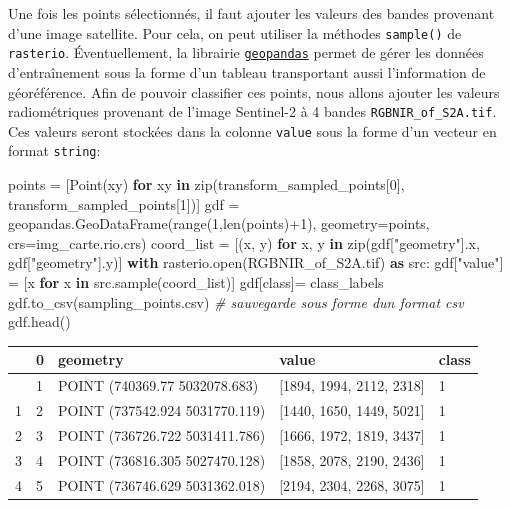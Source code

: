 \documentclass[
]{article}
\newenvironment{Shaded}{}{}
\newcommand{\BuiltInTok}[1]{\textcolor[rgb]{0.00,0.50,0.00}{#1}}
\newcommand{\CommentTok}[1]{\textcolor[rgb]{0.38,0.63,0.69}{\textit{#1}}}
\newcommand{\ControlFlowTok}[1]{\textcolor[rgb]{0.00,0.44,0.13}{\textbf{#1}}}
\newcommand{\DecValTok}[1]{\textcolor[rgb]{0.25,0.63,0.44}{#1}}
\newcommand{\ImportTok}[1]{\textcolor[rgb]{0.00,0.50,0.00}{\textbf{#1}}}
\newcommand{\KeywordTok}[1]{\textcolor[rgb]{0.00,0.44,0.13}{\textbf{#1}}}
\newcommand{\NormalTok}[1]{#1}
\newcommand{\OperatorTok}[1]{\textcolor[rgb]{0.40,0.40,0.40}{#1}}
\newcommand{\StringTok}[1]{\textcolor[rgb]{0.25,0.44,0.63}{#1}}
\begin{document}
Une fois les points sélectionnés, il faut ajouter les valeurs des bandes
provenant d'une image satellite. Pour cela, on peut utiliser la méthodes
\texttt{sample()} de \texttt{rasterio}. Éventuellement, la librairie
\href{https://geopandas.org}{\texttt{geopandas}} permet de gérer les
données d'entraînement sous la forme d'un tableau transportant aussi
l'information de géoréférence. Afin de pouvoir classifier ces points,
nous allons ajouter les valeurs radiométriques provenant de l'image
Sentinel-2 à 4 bandes \texttt{RGBNIR\_of\_S2A.tif}. Ces valeurs seront
stockées dans la colonne \texttt{value} sous la forme d'un vecteur en
format \texttt{string}:

\label{4b62cf70}
\label{cb12}
\begin{Shaded}
\begin{Highlighting}[]
\NormalTok{points }\OperatorTok{=}\NormalTok{ [Point(xy) }\ControlFlowTok{for}\NormalTok{ xy }\KeywordTok{in} \BuiltInTok{zip}\NormalTok{(transform\_sampled\_points[}\DecValTok{0}\NormalTok{], transform\_sampled\_points[}\DecValTok{1}\NormalTok{])]}
\NormalTok{gdf }\OperatorTok{=}\NormalTok{ geopandas.GeoDataFrame(}\BuiltInTok{range}\NormalTok{(}\DecValTok{1}\NormalTok{,}\BuiltInTok{len}\NormalTok{(points)}\OperatorTok{+}\DecValTok{1}\NormalTok{), geometry}\OperatorTok{=}\NormalTok{points, crs}\OperatorTok{=}\NormalTok{img\_carte.rio.crs)}
\NormalTok{coord\_list }\OperatorTok{=}\NormalTok{ [(x, y) }\ControlFlowTok{for}\NormalTok{ x, y }\KeywordTok{in} \BuiltInTok{zip}\NormalTok{(gdf[}\StringTok{"geometry"}\NormalTok{].x, gdf[}\StringTok{"geometry"}\NormalTok{].y)]}
\ControlFlowTok{with}\NormalTok{ rasterio.}\BuiltInTok{open}\NormalTok{(}\StringTok{\textquotesingle{}RGBNIR\_of\_S2A.tif\textquotesingle{}}\NormalTok{) }\ImportTok{as}\NormalTok{ src:}
\NormalTok{  gdf[}\StringTok{"value"}\NormalTok{] }\OperatorTok{=}\NormalTok{ [x }\ControlFlowTok{for}\NormalTok{ x }\KeywordTok{in}\NormalTok{ src.sample(coord\_list)]}
\NormalTok{gdf[}\StringTok{\textquotesingle{}class\textquotesingle{}}\NormalTok{]}\OperatorTok{=}\NormalTok{ class\_labels}
\NormalTok{gdf.to\_csv(}\StringTok{\textquotesingle{}sampling\_points.csv\textquotesingle{}}\NormalTok{) }\CommentTok{\# sauvegarde sous forme d\textquotesingle{}un format csv}
\NormalTok{gdf.head()}
\end{Highlighting}
\end{Shaded}

\begin{longtable}[]{@{}lllll@{}}
\toprule\noalign{}
& 0 & geometry & value & class \\
\midrule\noalign{}
\endhead
\bottomrule\noalign{}
\endlastfoot
0 & 1 & POINT (740369.77 5032078.683) & {[}1894, 1994, 2112, 2318{]} &
1 \\
1 & 2 & POINT (737542.924 5031770.119) & {[}1440, 1650, 1449, 5021{]} &
1 \\
2 & 3 & POINT (736726.722 5031411.786) & {[}1666, 1972, 1819, 3437{]} &
1 \\
3 & 4 & POINT (736816.305 5027470.128) & {[}1858, 2078, 2190, 2436{]} &
1 \\
4 & 5 & POINT (736746.629 5031362.018) & {[}2194, 2304, 2268, 3075{]} &
1 \\
\end{longtable}
\end{document}
